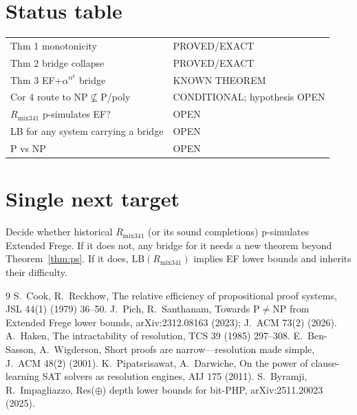 \documentclass[11pt]{article}
\theoremstyle{definition}
\begin{document}
\section*{Status table}
\begin{tabular}{ll}
Thm 1 monotonicity & PROVED/EXACT\\
Thm 2 bridge collapse & PROVED/EXACT\\
Thm 3 EF$+\alpha^{n^k}$ bridge & KNOWN THEOREM \cite{PS}\\
Cor 4 route to NP$\not\subseteq$P/poly & CONDITIONAL; hypothesis OPEN\\
$R_{\mathrm{mix341}}$ p-simulates EF? & OPEN\\
LB for any system carrying a bridge & OPEN\\
P vs NP & OPEN\\
\end{tabular}

\section*{Single next target}
Decide whether historical $R_{\mathrm{mix341}}$ (or its sound completions) p-simulates Extended Frege. If it does not, any bridge for it needs a new theorem beyond Theorem~\ref{thm:ps}. If it does, $\mathrm{LB}(R_{\mathrm{mix341}})$ implies EF lower bounds and inherits their difficulty.

\begin{thebibliography}{9}
 S.~Cook, R.~Reckhow, The relative efficiency of propositional proof systems, JSL 44(1) (1979) 36--50.
 J.~Pich, R.~Santhanam, Towards P$\ne$NP from Extended Frege lower bounds, arXiv:2312.08163 (2023); J.~ACM 73(2) (2026).
 A.~Haken, The intractability of resolution, TCS 39 (1985) 297--308.
 E.~Ben-Sasson, A.~Wigderson, Short proofs are narrow---resolution made simple, J.~ACM 48(2) (2001).
 K.~Pipatsrisawat, A.~Darwiche, On the power of clause-learning SAT solvers as resolution engines, AIJ 175 (2011).
 S.~Byramji, R.~Impagliazzo, Res($\oplus$) depth lower bounds for bit-PHP, arXiv:2511.20023 (2025).
\end{thebibliography}
\end{document}
